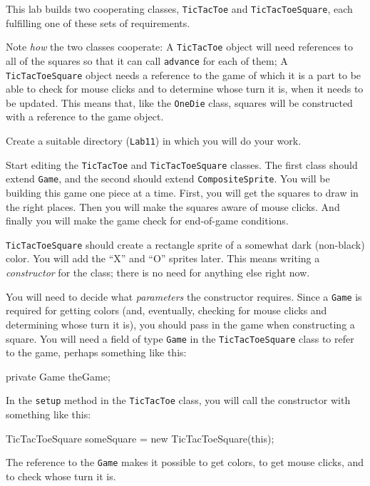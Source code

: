 \documentclass[12pt]{article}
\newenvironment{qv}%
  {\quote
   \verbatim}%
  {\endverbatim
   \endquote}
\newcommand{\code}{\texttt}
\begin{document}
This lab builds two cooperating classes, \code{TicTacToe} and
\code{TicTacToeSquare}, each fulfilling one of these sets of
requirements.

Note \emph{how} the two classes cooperate:
A \code{TicTacToe} object will need
references to all of the squares so that it can call \code{advance}
for each of them;
A \code{TicTacToeSquare} object needs a reference to the game
of which it is a part to be able to check for mouse clicks
and to determine whose turn it is,
when it needs to be updated.
This means that, like the \code{OneDie} class,
squares will be constructed with a reference to the game object.

Create a suitable directory (\verb'Lab11')
in which you will do your work.

Start editing the \code{TicTacToe} and \code{TicTacToeSquare} classes.
The first class should extend \code{Game},
and the second should extend \code{CompositeSprite}.
You will be building this game one piece at a time.
First, you will get the squares to draw in the right places.
Then you will make the squares aware of mouse clicks.
And finally you will make the game check for end-of-game
conditions. 

\code{TicTacToeSquare} should create a rectangle sprite of a somewhat dark
(non-black) color. You will add the ``X'' and ``O'' sprites later.
This means writing a \emph{constructor} for the class;
there is no need for anything else right now.

You will need to decide what \emph{parameters} the constructor requires.
Since a \code{Game} is required for getting colors
(and, eventually, checking for mouse clicks and determining whose turn it is),
you should pass in the game when constructing a square.
You will need a field of type \verb'Game'
in the \code{TicTacToeSquare} class to refer to the game,
perhaps something like this:

\begin{qv}
private Game theGame;
\end{qv}

In the \code{setup} method in the \code{TicTacToe} class,
you will call the constructor with something like this:

\begin{qv}
TicTacToeSquare someSquare = new TicTacToeSquare(this);
\end{qv}

The reference to the \code{Game} makes it possible
to get colors, to get mouse clicks, and to check whose turn it is.
\end{document}
